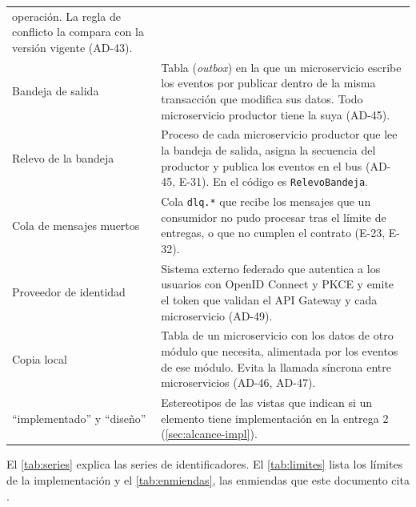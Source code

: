 \documentclass[11pt,letterpaper]{article}
\begin{document}
\begin{longtable}{L{3.8cm} L{12.0cm}}
operación. La regla de conflicto la compara con la versión vigente (AD-43). \\
Bandeja de salida & Tabla (\emph{outbox}) en la que un microservicio escribe los eventos por
publicar dentro de la misma transacción que modifica sus datos. Todo microservicio productor tiene
la suya (AD-45). \\
Relevo de la bandeja & Proceso de cada microservicio productor que lee la bandeja de salida,
asigna la secuencia del productor y publica los eventos en el bus (AD-45, E-31). En el código es
\texttt{RelevoBandeja}. \\
Cola de mensajes muertos & Cola \texttt{dlq.*} que recibe los mensajes que un consumidor no pudo
procesar tras el límite de entregas, o que no cumplen el contrato (E-23, E-32). \\
Proveedor de identidad & Sistema externo federado que autentica a los usuarios con OpenID Connect y
PKCE y emite el token que validan el API Gateway y cada microservicio (AD-49). \\
Copia local & Tabla de un microservicio con los datos de otro módulo que necesita, alimentada por
los eventos de ese módulo. Evita la llamada síncrona entre microservicios (AD-46, AD-47). \\
\enquote{implementado} y \enquote{diseño} & Estereotipos de las vistas que indican si un elemento
tiene implementación en la entrega 2 (\cref{sec:alcance-impl}). \\
\end{longtable}

El \cref{tab:series} explica las series de identificadores. El \cref{tab:limites} lista los límites de
la implementación \cite{revision} y el \cref{tab:enmiendas}, las enmiendas que este documento cita
\cite{enmiendas}.
\end{document}
